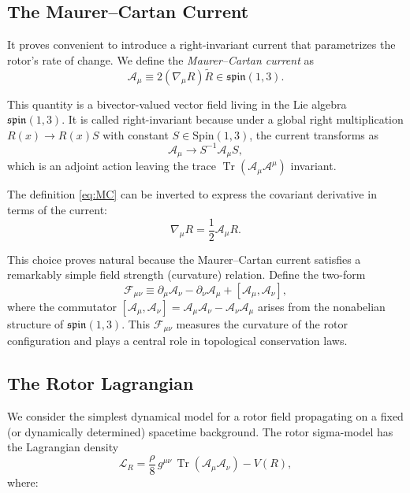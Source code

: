 \documentclass[11pt,a4paper]{article}
\numberwithin{equation}{section}
\theoremstyle{plain}
\theoremstyle{definition}
\theoremstyle{remark}
\DeclareMathOperator{\Tr}{Tr}
\begin{document}
\subsection{The Maurer--Cartan Current}

It proves convenient to introduce a right-invariant current that parametrizes the rotor's rate of change. We define the \emph{Maurer--Cartan current} as
\begin{equation}
\mathcal{A}_\mu \equiv 2(\nabla_\mu R)\widetilde{R}\in \mathfrak{spin}(1,3).
\label{eq:MC}
\end{equation}

This quantity is a bivector-valued vector field living in the Lie algebra $\mathfrak{spin}(1,3)$. It is called right-invariant because under a global right multiplication $R(x) \to R(x)S$ with constant $S \in \mathrm{Spin}(1,3)$, the current transforms as
\begin{equation}
\mathcal{A}_\mu \to S^{-1}\mathcal{A}_\mu S,
\end{equation}
which is an adjoint action leaving the trace $\Tr(\mathcal{A}_\mu \mathcal{A}^\mu)$ invariant.

The definition \eqref{eq:MC} can be inverted to express the covariant derivative in terms of the current:
\begin{equation}
\nabla_\mu R = \frac{1}{2}\mathcal{A}_\mu R.
\label{eq:nabla-from-A}
\end{equation}

This choice proves natural because the Maurer--Cartan current satisfies a remarkably simple field strength (curvature) relation. Define the two-form
\begin{equation}
\mathcal{F}_{\mu\nu} \equiv \partial_\mu\mathcal{A}_\nu - \partial_\nu\mathcal{A}_\mu + [\mathcal{A}_\mu, \mathcal{A}_\nu],
\label{eq:field-strength}
\end{equation}
where the commutator $[\mathcal{A}_\mu, \mathcal{A}_\nu] = \mathcal{A}_\mu \mathcal{A}_\nu - \mathcal{A}_\nu \mathcal{A}_\mu$ arises from the nonabelian structure of $\mathfrak{spin}(1,3)$. This $\mathcal{F}_{\mu\nu}$ measures the curvature of the rotor configuration and plays a central role in topological conservation laws.

\subsection{The Rotor Lagrangian}

We consider the simplest dynamical model for a rotor field propagating on a fixed (or dynamically determined) spacetime background. The rotor sigma-model has the Lagrangian density
\begin{equation}
\mathcal{L}_R = \frac{\rho}{8}\, g^{\mu\nu}\,\Tr(\mathcal{A}_\mu\mathcal{A}_\nu) - V(R),
\label{eq:Lrot}
\end{equation}
where:
\end{document}
